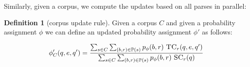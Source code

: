 \documentclass[12pt]{article}
\theoremstyle{definition}
\newtheorem{definition}{Definition}[section]
\begin{document}



Similarly, given a corpus, we compute the updates based on all parses in parallel:
\begin{definition}[corpus update rule]
  Given a corpus $C$ and given a probability assignment $\phi$ we can define an updated probability assignment $\phi'$ as follows:

 $$\phi_C'(q,e,q') = \frac{\sum_{s\in C}\sum_{(b,r)\in\mathbb{P}(s)} p_\phi(b,r)~ \textsc{TC}_r(q,e,q')}{\sum_{s\in C}\sum_{(b,r)\in\mathbb{P}(s)} p_\phi(b,r)~ \textsc{SC}_r(q)}$$ 
\end{definition}

\end{document}
